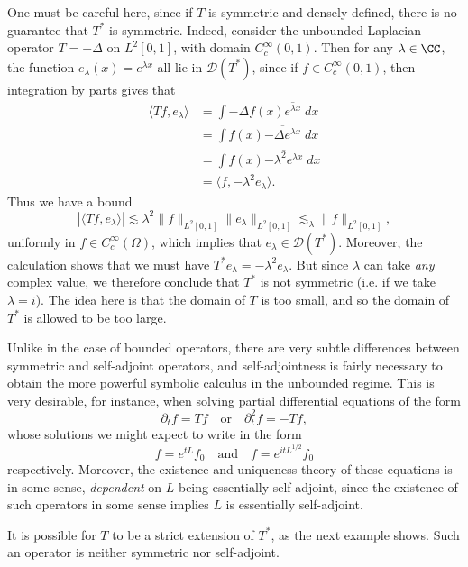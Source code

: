 \begin{remark}
    One must be careful here, since if $T$ is symmetric and densely defined, there is no guarantee that $T^*$ is symmetric. Indeed, consider the unbounded Laplacian operator $T = -\Delta$ on $L^2[0,1]$, with domain $C_c^\infty(0,1)$. Then for any $\lambda \in \CC$, the function $e_\lambda(x) = e^{\lambda x}$ all lie in $\mathcal{D}(T^*)$, since if $f \in C_c^\infty(0,1)$, then integration by parts gives that
    \begin{align*}
        \langle Tf, e_\lambda \rangle &= \int - \Delta f(x) \overline{e^{\lambda x}}\; dx\\
        &= \int f(x) \overline{ - \Delta e^{\lambda x} }\; dx\\
        &= \int f(x) \overline{ - \lambda^2 e^{\lambda x} }\; dx\\
        &= \langle f, - \lambda^2 e_\lambda \rangle.
    \end{align*}
    Thus we have a bound
    \[ |\langle T f, e_\lambda \rangle| \lesssim \lambda^2 \| f \|_{L^2[0,1]} \| e_\lambda \|_{L^2[0,1]} \lesssim_\lambda \| f \|_{L^2[0,1]}, \]
    uniformly in $f \in C_c^\infty(\Omega)$, which implies that $e_\lambda \in \mathcal{D}(T^*)$. Moreover, the calculation shows that  we must have $T^* e_\lambda = - \lambda^2 e_\lambda$. But since $\lambda$ can take \emph{any} complex value, we therefore conclude that $T^*$ is not symmetric (i.e. if we take $\lambda = i$). The idea here is that the domain of $T$ is too small, and so the domain of $T^*$ is allowed to be too large.
\end{remark}

Unlike in the case of bounded operators, there are very subtle differences between symmetric and self-adjoint operators, and self-adjointness is fairly necessary to obtain the more powerful symbolic calculus in the unbounded regime. This is very desirable, for instance, when solving partial differential equations of the form
%
\[ \partial_t f = Tf \quad\text{or}\quad \partial_t^2 f = - Tf, \]
%
whose solutions we might expect to write in the form
%
\[ f = e^{tL} f_0 \quad\text{and}\quad f = e^{itL^{1/2}} f_0 \]
%
respectively. Moreover, the existence and uniqueness theory of these equations is in some sense, \emph{dependent} on $L$ being essentially self-adjoint, since the existence of such operators in some sense implies $L$ is essentially self-adjoint.

It is possible for $T$ to be a strict extension of $T^*$, as the next example shows. Such an operator is neither symmetric nor self-adjoint.

